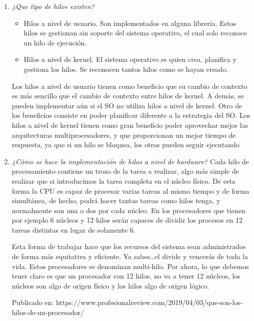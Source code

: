 \documentclass[a4paper,12pt]{article}
\begin{document}
\begin{enumerate}
\newpage %
\item {\it ¿Que tipo de hilos existen?}

\begin{itemize}
\item Hilos a nivel de usuario. Son implementados en alguna librería. Estos hilos se gestionan
sin soporte del sistema operativo, el cual solo reconoce un hilo de ejecución.

\item Hilos a nivel de kernel. El sistema operativo es quien crea, planifica y gestiona los hilos. Se
reconocen tantos hilos como se hayan creado.




\end{itemize}

Los hilos a nivel de usuario tienen como beneficio que su cambio de contexto es más
sencillo que el cambio de contexto entre hilos de kernel. A demás, se pueden
implementar aún si el SO no utiliza hilos a nivel de kernel. Otro de los beneficios
consiste en poder planificar diferente a la estrategia del SO.
Los hilos a nivel de kernel tienen como gran beneficio poder aprovechar mejor las
arquitecturas multiprocesadores, y que proporcionan un mejor tiempo de respuesta, ya
que si un hilo se bloquea, los otros pueden seguir ejecutando

\item {\it ¿Cómo se hace la implementación de hilos a nivel de hardware?}
Cada hilo de procesamiento contiene un trozo de la tarea a realizar, algo más simple de realizar que si introducimos la tarea completa en el núcleo físico. De esta forma la CPU es capaz de procesar varias tareas al mismo tiempo y de forma simultánea, de hecho, podrá hacer tantas tareas como hilos tenga, y normalmente son una o dos por cada núcleo. En los procesadores que tienen por ejemplo 6 núcleos y 12 hilos serán capaces de dividir los procesos en 12 tareas distintas en lugar de solamente 6.

Esta forma de trabajar hace que los recursos del sistema sean administrados de forma más equitativa y eficiente. Ya sabes…el divide y vencerás de toda la vida. Estos procesadores se denominan multi-hilo. Por ahora, lo que debemos tener claro es que un procesador con 12 hilos, no va a tener 12 núcleos, los núcleos son algo de origen físico y los hilos algo de origen lógico.



Publicado en: https://www.profesionalreview.com/2019/04/03/que-son-los-hilos-de-un-procesador/







\end{enumerate}
\end{document}
